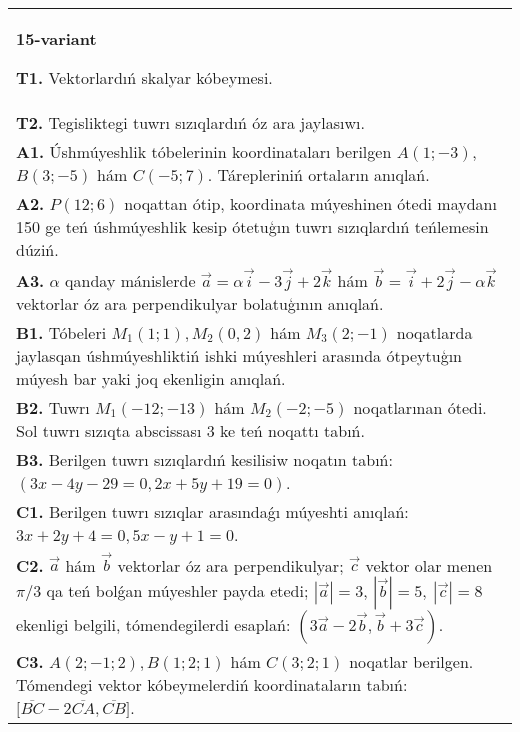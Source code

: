 \documentclass{article}
\begin{document}
\begin{tabular}{m{17cm}}
\textbf{15-variant}

\textbf{T1.} 
Vektorlardıń skalyar kóbeymesi.
 \\
\textbf{T2.} 
Tegisliktegi tuwrı sızıqlardıń óz ara jaylasıwı.
 \\
\textbf{A1.} 
Úshmúyeshlik tóbelerinin koordinataları berilgen
$A (1;-3) $, $B (3;-5) $ hám $C (-5;7) $. Tárepleriniń ortaların
anıqlań.
 \\
\textbf{A2.} 
$P (12;6) $ noqattan ótip, koordinata múyeshinen ótedi
maydanı 150 ge teń úshmúyeshlik kesip ótetuģın tuwrı sızıqlardıń
teńlemesin dúziń.
 \\
\textbf{A3.} 
$\alpha$
qanday mánislerde
$\overrightarrow{a} = \alpha\overrightarrow{i} - 3\overrightarrow{j} + 2\overrightarrow{k}$
hám
$\overrightarrow{b} = \overrightarrow{i} + 2\overrightarrow{j} - \alpha\overrightarrow{k}$
vektorlar óz ara perpendikulyar bolatuģının anıqlań.
 \\
\textbf{B1.} 
Tóbeleri \(M_{1} (1;1), M_{2} (0,2) \) hám
\(M_{3} (2;-1) \) noqatlarda jaylasqan úshmúyeshliktiń ishki
múyeshleri arasında ótpeytuģın múyesh bar yaki joq ekenligin anıqlań.
 \\
\textbf{B2.} 
Tuwrı \(M_{1} (-12;-13) \) hám \(M_{2} (-2;-5) \)
noqatlarınan ótedi. Sol tuwrı sızıqta abscissası 3 ke teń noqattı tabıń.
 \\
\textbf{B3.} 
Berilgen tuwrı sızıqlardıń kesilisiw noqatın tabıń:
$(3x-4y-29=0, 2x+5y+19=0) $.
 \\
\textbf{C1.} 
Berilgen tuwrı sızıqlar arasındaǵı múyeshti anıqlań: $3x+2y+4=0, 5x-y+1=0$.
 \\
\textbf{C2.} 
$\vec{a}$ hám $\vec{b}$ vektorlar óz ara perpendikulyar; $\vec{c}$ vektor olar menen $\pi/3$ qa teń bolǵan múyeshler payda etedi; $|\vec{a}| = 3$, $|\vec{b}| = 5,\ |\vec{c}| = 8$ ekenligi belgili, tómendegilerdi esaplań:
$\left(3\vec{a} - 2\vec{b},\vec{b} + 3\vec{c} \right) $.
 \\
\textbf{C3.} 
$A (2; -1;2), B (1;2; 1) $ hám $C (3;2;1) $ noqatlar berilgen. Tómendegi vektor kóbeymelerdiń koordinataların tabıń:
$\lbrack\overline{BC} - 2\overline{CA},\overline{CB}\rbrack$. \\

\end{tabular}
\vspace{1cm}
\end{document}
